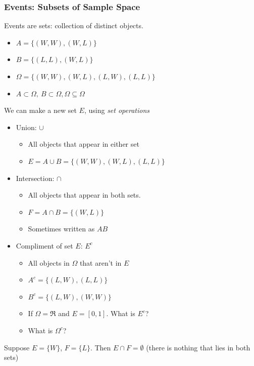 \documentclass[handout]{beamer}
\numberwithin{equation}{section}
\begin{document}
\begin{frame}
\frametitle{Events: Subsets of Sample Space}

Events are \alert{sets}\pause: collection of distinct
  objects.  \\
\begin{itemize}
\item[] $A = \{ (W,W), (W,L) \}$  \pause
\item[] $B  = \{ (L, L), (W,L) \} $ \pause
\item[] $\Omega = \{(W,W), (W,L), (L,W), (L,L) \}$ \pause
\item[] $A\subset \Omega,\ B\subset \Omega, \Omega \subseteq \Omega$ \pause
\end{itemize}
We can make a new set $E$, using \emph{set operations} \pause
\begin{itemize}
\item[1)] Union: $\cup$  \pause
\begin{itemize}
\item[-] All objects that appear in \alert{either} set  \pause
\item[-] $E = A\cup B  = \{(W,W), (W,L), (L,L) \} $ \pause
\end{itemize}
\item[2)] Intersection: $\cap$  \pause
\begin{itemize}
\item[-] All objects that appear in \alert{both} sets. \pause
\item[-] $F= A\cap B = \{(W,L)\} $ \pause
\item[-] Sometimes written as $AB$ 
\end{itemize}
\end{itemize}

\end{frame}


\begin{frame}

\begin{itemize}
\item[3)] \alert{Compliment} of set $E$: $E^{c}$ \pause
\begin{itemize}
\item[-] All objects in $\Omega$ that aren't in $E$ \pause
\item[-] $A^{c} = \{(L, W) , (L, L) \} $ \pause
\item[-] $B^{c} = \{(L, W) , (W, W) \} $ \pause 
\item[-] If $\Omega = \Re$ and $E = [0,1]$.  What is $E^{c}$?  \pause
\item[-] What is $\Omega^{c}$? 
\end{itemize}
\end{itemize}

Suppose $E = \{W\}$, $F = \{L\}$.  Then  $E \cap F = \emptyset$ (there is nothing that lies in both sets)

\end{frame}
\end{document}
